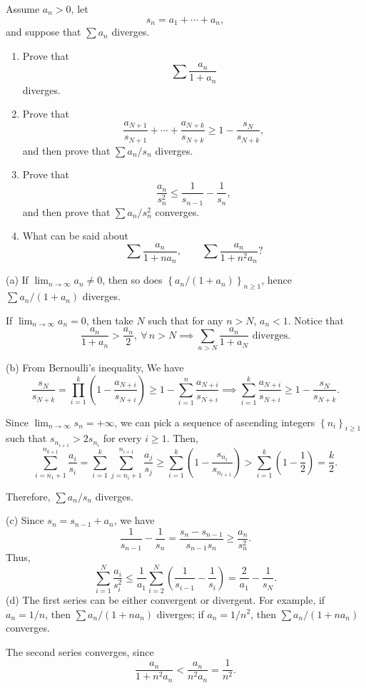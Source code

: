 \documentclass{article}
\begin{document}
\begin{problem}[3-11]
Assume $a_n>0$, let
\[
s_n=a_1+\cdots+a_n,
\]
and suppose that $\sum a_n$ diverges.

\begin{enumerate}
\item[(a)] Prove that
\[
\sum \frac{a_n}{1+a_n}
\]
diverges.

\item[(b)] Prove that
\[
\frac{a_{N+1}}{s_{N+1}}+\cdots+\frac{a_{N+k}}{s_{N+k}}\ge 1-\frac{s_N}{s_{N+k}},
\]
and then prove that \(\sum {a_n}/{s_n} \)
diverges.

\item[(c)] Prove that
\[
\frac{a_n}{s_n^2}\le \frac{1}{s_{n-1}}-\frac{1}{s_n},
\]
and then prove that \( \sum {a_n}/{s_n^2} \)
converges.

\item[(d)] What can be said about
\[
\sum \frac{a_n}{1+n a_n},\qquad \sum \frac{a_n}{1+n^2 a_n}?
\]
\end{enumerate}
\end{problem}

\begin{solution}
  (a) If \( \lim_{n\to\infty}a_n\neq 0 \), then so does \( \left\{a_n/(1+a_n)\right\}_{n\ge 1} \), hence \( \sum a_n/(1+a_n) \) diverges.\par
  If \( \lim_{n\to\infty}a_n=0 \), then take \( N \) such that for any \( n>N \), \( a_n<1 \). Notice that
  \[ \frac{a_n}{1+a_n}>\frac{a_n}{2},\ \forall\,n>N\implies \sum_{n>N}\frac{a_n}{1+a_N}\text{ diverges}. \] \par
  (b) From Bernoulli's inequality, We have
  \[ \frac{s_{N}}{s_{N+k}}=\prod_{i=1}^{k}\left(1-\frac{a_{N+i}}{s_{N+i}}\right)\ge 1-\sum_{i=1}^{n}\frac{a_{N+i}}{s_{N+i}}\implies \sum_{i=1}^{k}\frac{a_{N+i}}{s_{N+i}}\ge 1-\frac{s_{N}}{s_{N+k}}. \]\par
  Since \( \lim_{n\to\infty}s_n=+\infty \), we can pick a sequence of ascending integers \( \left\{n_i\right\}_{i\ge 1} \) such that \( s_{n_{i+1}}>2s_{n_i} \) for every \( i\ge 1 \). Then, 
  \[ \sum_{i=n_1+1}^{n_{k+1}}\frac{a_{i}}{s_{i}}=\sum_{i=1}^{k}\sum_{j=n_{i}+1}^{n_{i+1}}\frac{a_{j}}{s_{j}}\ge\sum_{i=1}^{k}\left(1-\frac{s_{n_i}}{s_{n_{i+1}}}\right)>\sum_{i=1}^{k}\left(1-\frac{1}{2}\right)=\frac{k}{2}. \] \par
  Therefore, \( \sum {a_n}/{s_n} \) diverges.\par
  (c) Since \( s_n=s_{n-1}+a_n \), we have
  \[ \frac{1}{s_{n-1}}-\frac{1}{s_n}=\frac{s_{n}-s_{n-1}}{s_{n-1}s_{n}}\ge \frac{a_{n}}{s_{n}^2}. \] 
  Thus, 
  \[ \sum_{i=1}^{N}\frac{a_i}{s_i^2}\le\frac{1}{a_1} \sum_{i=2}^{N}\left(\frac{1}{s_{i-1}}-\frac{1}{s_i}\right)=\frac{2}{a_1}-\frac{1}{s_N}. \] 
  (d) The first series can be either convergent or divergent. For example, if \( a_n=1/n \), then \( \sum a_n/(1+na_n) \) diverges; if \( a_n=1/n^2 \), then \( \sum a_n/(1+na_n) \) converges. \par
  The second series converges, since
  \[ \frac{a_n}{1+n^2a_n}<\frac{a_n}{n^2a_n}=\frac{1}{n^2}. \] 
\end{solution}
\end{document}
